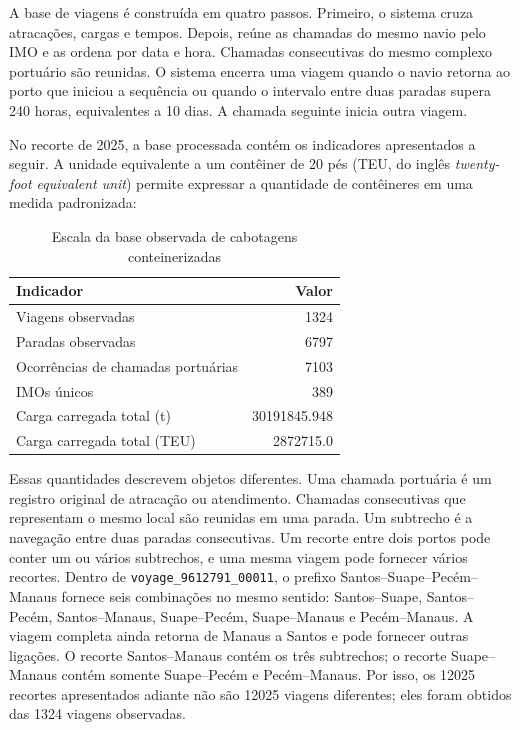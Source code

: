 \documentclass[12pt,a4paper]{report}
\begin{document}
A base de viagens é construída em quatro passos. Primeiro, o sistema cruza atracações, cargas e tempos. Depois, reúne as chamadas do mesmo navio pelo IMO e as ordena por data e hora. Chamadas consecutivas do mesmo complexo portuário são reunidas. O sistema encerra uma viagem quando o navio retorna ao porto que iniciou a sequência ou quando o intervalo entre duas paradas supera 240 horas, equivalentes a 10 dias. A chamada seguinte inicia outra viagem.

No recorte de 2025, a base processada contém os indicadores apresentados a seguir. A unidade equivalente a um contêiner de 20 pés (TEU, do inglês \emph{twenty-foot equivalent unit}) permite expressar a quantidade de contêineres em uma medida padronizada:

\begin{table}[htbp]
\centering
\caption{Escala da base observada de cabotagens conteinerizadas}
\label{tab:base-observada}
\begin{tabular}{lr}
\toprule
Indicador & Valor \\
\midrule
Viagens observadas & \num{1324} \\
Paradas observadas & \num{6797} \\
Ocorrências de chamadas portuárias & \num{7103} \\
IMOs únicos & \num{389} \\
Carga carregada total (t) & \num{30191845.948} \\
Carga carregada total (TEU) & \num{2872715.0} \\
\bottomrule
\end{tabular}
\end{table}

Essas quantidades descrevem objetos diferentes. Uma chamada portuária é um registro original de atracação ou atendimento. Chamadas consecutivas que representam o mesmo local são reunidas em uma parada. Um subtrecho é a navegação entre duas paradas consecutivas. Um recorte entre dois portos pode conter um ou vários subtrechos, e uma mesma viagem pode fornecer vários recortes. Dentro de \texttt{voyage\_9612791\_00011}, o prefixo Santos--Suape--Pecém--Manaus fornece seis combinações no mesmo sentido: Santos--Suape, Santos--Pecém, Santos--Manaus, Suape--Pecém, Suape--Manaus e Pecém--Manaus. A viagem completa ainda retorna de Manaus a Santos e pode fornecer outras ligações. O recorte Santos--Manaus contém os três subtrechos; o recorte Suape--Manaus contém somente Suape--Pecém e Pecém--Manaus. Por isso, os \num{12025} recortes apresentados adiante não são \num{12025} viagens diferentes; eles foram obtidos das \num{1324} viagens observadas.
\end{document}
